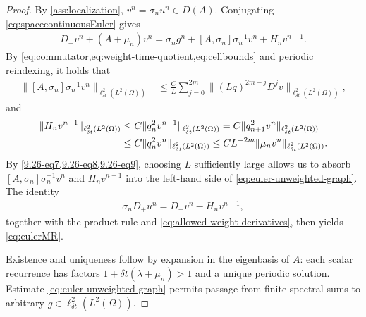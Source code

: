 \documentclass[print,wide,eng]{draft}
\begin{document}
\begin{proof}
By \cref{ass:localization}, $v^n=\sigma_nu^n\in D(A)$. Conjugating \cref{eq:spacecontinuousEuler} gives
%
\begin{align}\label{9.26-eq7}
D_+v^n+(A+\mu_n)v^n
=\sigma_ng^n+[A,\sigma_n]\sigma_n^{-1}v^n
+H_nv^{n-1}.
\end{align}
%
By \cref{eq:commutator,eq:weight-time-quotient,eq:cellbounds} and periodic reindexing,
it holds that
%
\begin{align}\label{9.26-eq8}
\|[A,\sigma_n]\sigma_n^{-1}v^n\|_{\ell_{\delta t}^2(L^2(\Omega))}
&\leq\frac{C}{L}\sum_{j=0}^{2m}\|(Lq)^{2m-j}D^jv\|_{\ell_{\delta t}^2(L^2(\Omega))},
\end{align}
%
and
%
\begin{align}\label{9.26-eq9}
\|H_nv^{n-1}\|_{\ell_{\delta t}^2(L^2(\Omega))}
&\leq C\|q_n^2v^{n-1}\|_{\ell_{\delta t}^2(L^2(\Omega))}
=C\|q_{n+1}^2v^n\|_{\ell_{\delta t}^2(L^2(\Omega))}
\notag
\\
&\leq C\|q_n^2v^n\|_{\ell_{\delta t}^2(L^2(\Omega))}
\leq CL^{-2m}\|\mu_nv^n\|_{\ell_{\delta t}^2(L^2(\Omega))}.
\end{align}
%
By \cref{9.26-eq7,9.26-eq8,9.26-eq9}, choosing $L$ sufficiently large allows us to absorb $[A,\sigma_n]\sigma_n^{-1}v^n$ and $H_nv^{n-1}$ into the left-hand side of \cref{eq:euler-unweighted-graph}. The identity
%
\begin{align*}
\sigma_nD_+u^n=D_+v^n-H_nv^{n-1},
\end{align*}
%
together with the product rule and \cref{eq:allowed-weight-derivatives}, then yields \cref{eq:eulerMR}.

Existence and uniqueness follow by expansion in the eigenbasis of $A$: each scalar recurrence has factors $1+{\delta t}(\lambda+\mu_n)>1$ and a unique periodic solution. Estimate \cref{eq:euler-unweighted-graph} permits passage from finite spectral sums to arbitrary $g\in\ell_{\delta t}^2(L^2(\Omega))$.
\end{proof}
%
\end{document}
